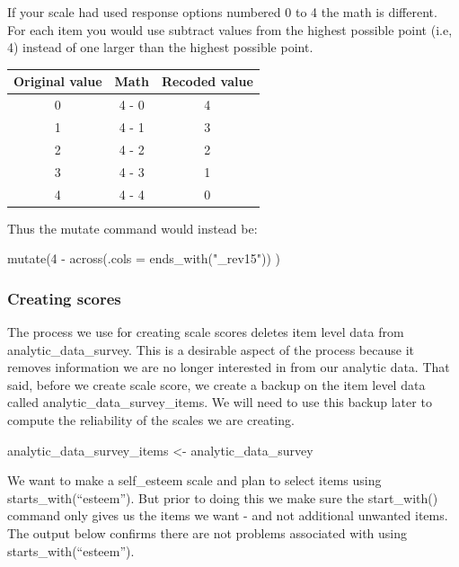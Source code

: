 \documentclass[
]{krantz}
\makeatletter
\newenvironment{Shaded}{\begin{snugshade}}{\end{snugshade}}
\newcommand{\NormalTok}[1]{#1}
\newcommand{\StringTok}[1]{\textcolor[rgb]{0.5,0.5,0.5}{#1}}
\newenvironment{kframe}{%
\medskip{}
\setlength{\fboxsep}{.8em}
 \def\at@end@of@kframe{}%
 \ifinner\ifhmode%
  \def\at@end@of@kframe{\end{minipage}}%
  \begin{minipage}{\columnwidth}%
 \fi\fi%
 \def\FrameCommand##1{\hskip\@totalleftmargin \hskip-\fboxsep
 \colorbox{shadecolor}{##1}\hskip-\fboxsep
     \hskip-\linewidth \hskip-\@totalleftmargin \hskip\columnwidth}%
 \MakeFramed {\advance\hsize-\width
   \@totalleftmargin\z@ \linewidth\hsize
   \@setminipage}}%
 {\par\unskip\endMakeFramed%
 \at@end@of@kframe}
\newenvironment{rmdblock}[1]
  {
  \begin{itemize}
  \renewcommand{\labelitemi}{
    \raisebox{-.7\height}[0pt][0pt]{
      {\setkeys{Gin}{width=3em,keepaspectratio}\texttt{[image: images/\#1]}}
    }
  }
  \setlength{\fboxsep}{1em}
  \begin{kframe}
  \item
  }
  {
  \end{kframe}
  \end{itemize}
  }
\newenvironment{rmdcaution}
  {\begin{rmdblock}{caution}}
  {\end{rmdblock}}
\renewenvironment{Shaded}{\begin{kframe}}{\end{kframe}}
\makeatother
\begin{document}
\begin{rmdcaution}
\begin{rmdcaution}

If your scale had used response options numbered 0 to 4 the math is different.
For each item you would use subtract values from the highest possible point (i.e, 4) instead of one larger than the highest possible point.

\begin{longtable}[]{@{}ccc@{}}
\toprule
Original value & Math & Recoded value\tabularnewline
\midrule
\endhead
0 & 4 - 0 & 4\tabularnewline
1 & 4 - 1 & 3\tabularnewline
2 & 4 - 2 & 2\tabularnewline
3 & 4 - 3 & 1\tabularnewline
4 & 4 - 4 & 0\tabularnewline
\bottomrule
\end{longtable}

Thus the mutate command would instead be:

mutate(4 - across(.cols = ends\_with("\_rev15")) )

\end{rmdcaution}
\end{rmdcaution}

\hypertarget{creating-scores}{%
\subsubsection{Creating scores}\label{creating-scores}}

The process we use for creating scale scores deletes item level data from analytic\_data\_survey. This is a desirable aspect of the process because it removes information we are no longer interested in from our analytic data. That said, before we create scale score, we create a backup on the item level data called analytic\_data\_survey\_items. We will need to use this backup later to compute the reliability of the scales we are creating.

\begin{Shaded}
\begin{Highlighting}[]
\NormalTok{analytic_data_survey_items <-}\StringTok{ }\NormalTok{analytic_data_survey}
\end{Highlighting}
\end{Shaded}

We want to make a self\_esteem scale and plan to select items using starts\_with(``esteem''). But prior to doing this we make sure the start\_with() command only gives us the items we want - and not additional unwanted items. The output below confirms there are not problems associated with using starts\_with(``esteem'').
\end{document}
